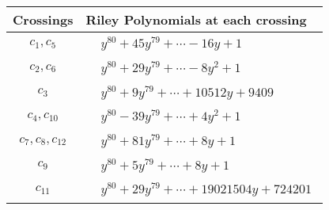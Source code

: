 \documentclass[1p]{elsarticle_modified}
\theoremstyle{definition}
\begin{document}
\begin{tabular}{m{50pt}|m{274pt}}
Crossings & \hspace{64pt}Riley Polynomials at each crossing \\
\hline $$\begin{aligned}c_{1},c_{5}\end{aligned}$$&$\begin{aligned}
&y^{80}+45 y^{79}+\cdots-16 y+1
\end{aligned}$\\
\hline $$\begin{aligned}c_{2},c_{6}\end{aligned}$$&$\begin{aligned}
&y^{80}+29 y^{79}+\cdots-8 y^2+1
\end{aligned}$\\
\hline $$\begin{aligned}c_{3}\end{aligned}$$&$\begin{aligned}
&y^{80}+9 y^{79}+\cdots+10512 y+9409
\end{aligned}$\\
\hline $$\begin{aligned}c_{4},c_{10}\end{aligned}$$&$\begin{aligned}
&y^{80}-39 y^{79}+\cdots+4 y^2+1
\end{aligned}$\\
\hline $$\begin{aligned}c_{7},c_{8},c_{12}\end{aligned}$$&$\begin{aligned}
&y^{80}+81 y^{79}+\cdots+8 y+1
\end{aligned}$\\
\hline $$\begin{aligned}c_{9}\end{aligned}$$&$\begin{aligned}
&y^{80}+5 y^{79}+\cdots+8 y+1
\end{aligned}$\\
\hline $$\begin{aligned}c_{11}\end{aligned}$$&$\begin{aligned}
&y^{80}+29 y^{79}+\cdots+19021504 y+724201
\end{aligned}$\\
\hline
\end{tabular}
\vskip 2pc
\end{document}
